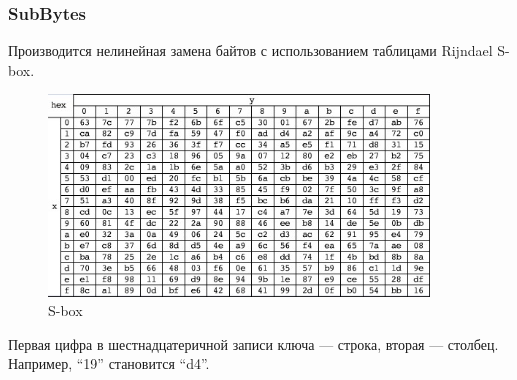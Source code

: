 \documentclass[a4paper, 14pt]{extarticle}
\begin{document}
\subsubsection{SubBytes}
Производится нелинейная замена байтов с использованием таблицами Rijndael S-box.

\begin{figure}[h]
    \centering
    \includegraphics[width=0.9\textwidth]{img/S004.jpg}
    \caption{S-box}
\end{figure}
Первая цифра в шестнадцатеричной записи ключа --- строка, вторая --- столбец. Например, ``19'' становится ``d4''.

\FloatBarrier{}
\end{document}
